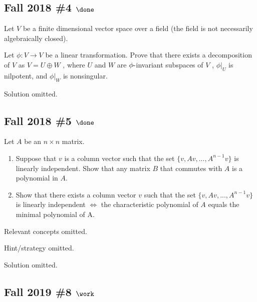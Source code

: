 \hypertarget{fall-2018-4-done}{%
\subsection{\texorpdfstring{Fall 2018 \#4
\(\done\)}{Fall 2018 \#4 \textbackslash done}}\label{fall-2018-4-done}}

Let \(V\) be a finite dimensional vector space over a field (the field
is not necessarily algebraically closed).

Let \(\phi : V \to V\) be a linear transformation. Prove that there
exists a decomposition of \(V\) as \(V = U \oplus W\) , where \(U\) and
\(W\) are \(\phi{\hbox{-}}\)invariant subspaces of \(V\) ,
\({\left.{{\phi}} \right|_{{U}} }\) is nilpotent, and
\({\left.{{\phi}} \right|_{{W}} }\) is nonsingular.


Solution omitted.

\hypertarget{fall-2018-5-done}{%
\subsection{\texorpdfstring{Fall 2018 \#5
\(\done\)}{Fall 2018 \#5 \textbackslash done}}\label{fall-2018-5-done}}

Let \(A\) be an \(n \times n\) matrix.

\begin{enumerate}
\def\labelenumi{\alph{enumi}.}
\item
  Suppose that \(v\) is a column vector such that the set
  \(\{v, Av, . . . , A^{n-1} v\}\) is linearly independent. Show that
  any matrix \(B\) that commutes with \(A\) is a polynomial in \(A\).
\item
  Show that there exists a column vector \(v\) such that the set
  \(\{v, Av, . . . , A^{n-1} v\}\) is linearly independent \(\iff\) the
  characteristic polynomial of \(A\) equals the minimal polynomial of A.
\end{enumerate}

Relevant concepts omitted.

Hint/strategy omitted.

Solution omitted.

\hypertarget{fall-2019-8-work}{%
\subsection{\texorpdfstring{Fall 2019 \#8
\(\work\)}{Fall 2019 \#8 \textbackslash work}}\label{fall-2019-8-work}}

